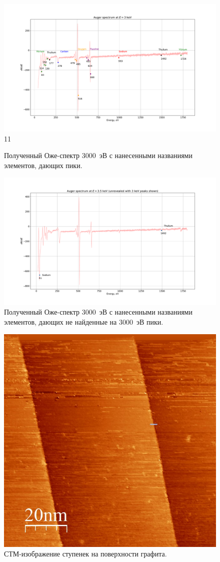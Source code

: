 \documentclass[a4paper, 12pt]{article}
\begin{document}
\begin{figure}[H]
	\centering
	\includegraphics[width=1.3\linewidth, angle=-90]{1_Auge_3000}11
	\caption{Полученный Оже-спектр 3000~эВ с нанесенными названиями элементов, дающих пики.}
	\label{fig:1_Auge_3000}
\end{figure}

\newpage

\begin{figure}[H]
	\centering
	\includegraphics[width=1.3\linewidth, angle=-90]{1_Auge_3500}
	\caption{Полученный Оже-спектр 3000~эВ с нанесенными названиями элементов, дающих не найденные на 3000~эВ пики.}
	\label{fig:1_Auge_3500}
\end{figure}

\newpage

\begin{figure}[H]
	\centering
	\includegraphics[width=0.6\linewidth]{2_step}
	\caption{СТМ-изображение ступенек на поверхности графита.}
	\label{fig:2_step}
\end{figure}
\end{document}
